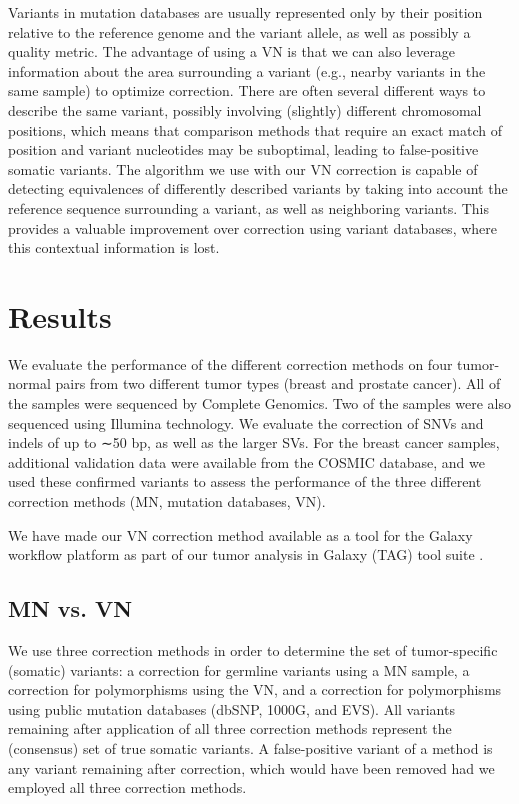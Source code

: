Variants in mutation databases are usually represented only by their position relative to the reference genome and the variant allele, as well as possibly a quality metric. The advantage of using a VN is that we can also leverage information about the area surrounding a variant (e.g., nearby variants in the same sample) to optimize correction. There are often several different ways to describe the same variant, possibly involving (slightly) different chromosomal positions, which means that comparison methods that require an exact match of position and variant nucleotides may be suboptimal, leading to false-positive somatic variants. The algorithm we use with our VN correction is capable of detecting equivalences of differently described variants by taking into account the reference sequence surrounding a variant, as well as neighboring variants. This provides a valuable improvement over correction using variant databases, where this contextual information is lost.

\section*{Results}

We evaluate the performance of the different correction methods on four tumor-normal pairs from two different tumor types (breast and prostate cancer). All of the samples were sequenced by Complete Genomics. Two of the samples were also sequenced using Illumina technology. We evaluate the correction of SNVs and indels of up to ∼50 bp, as well as the larger SVs. For the breast cancer samples, additional validation data were available from the COSMIC database, and we used these confirmed variants to assess the performance of the three different correction methods (MN, mutation databases, VN).

We have made our VN correction method available as a tool for the Galaxy workflow platform \cite{giardine2005galaxy,blankenberg2010galaxy2,goecks2010galaxy} as part of our tumor analysis in Galaxy (TAG) tool suite \cite{hiltemann2014cgtag}.

\subsection*{MN vs. VN}

We use three correction methods in order to determine the set of tumor-specific (somatic) variants: a correction for germline variants using a MN sample, a correction for polymorphisms using the VN, and a correction for polymorphisms using public mutation databases (dbSNP, 1000G, and EVS). All variants remaining after application of all three correction methods represent the (consensus) set of true somatic variants. A false-positive variant of a method is any variant remaining after correction, which would have been removed had we employed all three correction methods.


